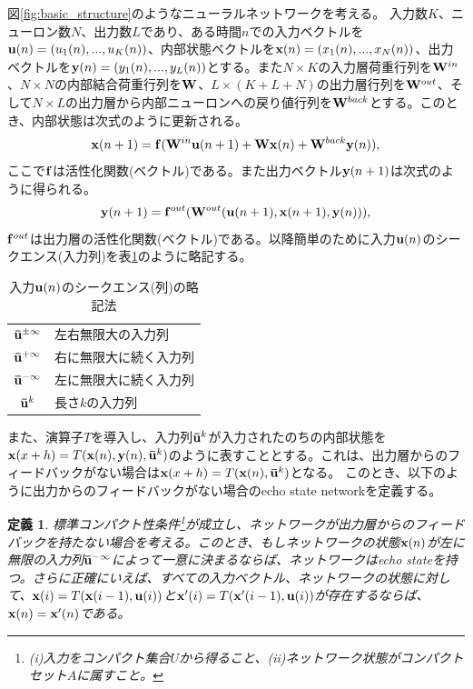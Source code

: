 \documentclass{jsarticle}
\newtheorem{dfn}{定義}
\begin{document}
図\ref{fig:basic_structure}のようなニューラルネットワークを考える。
入力数$K$、ニューロン数$N$、出力数$L$であり、ある時間$n$での入力ベクトルを${\bf u}(n) = (u_1(n),...,u_K(n))$、内部状態ベクトルを${\bf x}(n) = (x_1(n),...,x_N(n))$、出力ベクトルを${\bf y}(n) = (y_1(n),...,y_L(n))$とする。また$N\times K$の入力層荷重行列を${\bf W}^{in}$、$N\times N$の内部結合荷重行列を$\bf W$、$L\times (K+L+N)$の出力層行列を${\bf W}^{out}$、そして$N\times L$の出力層から内部ニューロンへの戻り値行列を${\bf W}^{back}$とする。このとき、内部状態は次式のように更新される。
\begin{equation}
	{\bf x}(n+1)={\bf f}({\bf W}^{in}{\bf u}(n+1)+{\bf W}{\bf x}(n)+{\bf W}^{back}{\bf y}(n)),
	\label{eq:increment_x}
\end{equation}
ここで$\bf f$は活性化関数(ベクトル)である。また出力ベクトル${\bf y}(n+1)$は次式のように得られる。
\begin{equation}
	{\bf y}(n+1)={\bf f}^{out}({\bf W}^{out}({\bf u}(n+1),{\bf x}(n+1),{\bf y}(n))),
	\label{eq:increment_y}
\end{equation}
${\bf f}^{out}$は出力層の活性化関数(ベクトル)である。以降簡単のために入力${\bf u}(n)$のシークエンス(入力列)を表\ref{tb:u_shorthand}のように略記する。
\begin{table}[htb]
\caption{入力${\bf u}(n)$のシークエンス(列)の略記法}
\centering
  \begin{tabular}{cl}
    ${\bf \bar u}^{\pm \infty}$ & 左右無限大の入力列\\
    ${\bf \bar u}^{+ \infty}$ & 右に無限大に続く入力列\\
    ${\bf \bar u}^{- \infty}$ & 左に無限大に続く入力列\\
    ${\bf \bar u}^{k}$ & 長さ$k$の入力列
  \end{tabular}
  \label{tb:u_shorthand}
\end{table}
また、演算子$T$を導入し、入力列${\bf \bar u}^{k}$が入力されたのちの内部状態を${\bf x}(x+h) = T({\bf x}(n),{\bf y}(n),{\bf \bar u}^{k})$のように表すこととする。これは、出力層からのフィードバックがない場合は${\bf x}(x+h) = T({\bf x}(n),{\bf \bar u}^{k})$となる。
このとき、以下のように出力からのフィードバックがない場合のecho state networkを定義する。
\begin{dfn}
標準コンパクト性条件\footnote{(i)入力をコンパクト集合$U$から得ること、(ii)ネットワーク状態がコンパクトセット$A$に属すこと。}が成立し、ネットワークが出力層からのフィードバックを持たない場合を考える。このとき、もしネットワークの状態${\bf x}(n)$が左に無限の入力列${\bf \bar u}^{- \infty}$によって一意に決まるならば、ネットワークはecho stateを持つ。さらに正確にいえば、すべての入力ベクトル、ネットワークの状態に対して、${\bf x}(i) = T({\bf x}(i-1),{\bf u}(i))$と${\bf x'}(i) = T({\bf x'}(i-1),{\bf u}(i))$が存在するならば、${\bf x}(n)={\bf x'}(n)$である。
\end{dfn}
\end{document}
